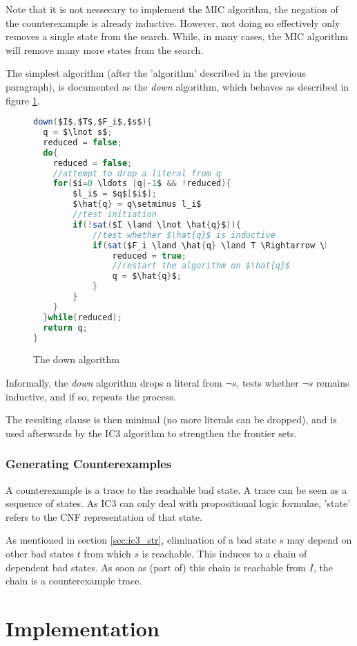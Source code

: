 \documentclass[a4paper]{article}
\begin{document}
Note that it is not nessecary to implement the MIC algorithm, the negation of the counterexample is already inductive. However, not doing so effectively only removes a single state from the search. While, in many cases, the MIC algorithm will remove many more states from the search.

The simplest algorithm (after the 'algorithm' described in the previous paragraph), is documented as the \emph{down} algorithm, which behaves as described in figure \ref{fig:down}.

\begin{figure}
\centering
\begin{lstlisting}[mathescape,language=Java]
down($I$,$T$,$F_i$,$s$){
  q = $\lnot s$;
  reduced = false;
  do{
  	reduced = false;
  	//attempt to drop a literal from q
  	for($i=0 \ldots |q|-1$ && !reduced){
  		$l_i$ = $q$[$i$];
	  	$\hat{q} = q\setminus l_i$ 
	  	//test initiation
	  	if(!sat($I \land \lnot \hat{q}$)){
	  		//test whether $\hat{q}$ is inductive
	  		if(sat($F_i \land \hat{q} \land T \Rightarrow \hat{q}'$)){
	  			reduced = true;
	  			//restart the algorithm on $\hat{q}$
	  			q = $\hat{q}$;
			}	  		
	  	}
  	}
  }while(reduced);
  return q;
}
\end{lstlisting}
\caption{The down algorithm}
\label{fig:down}
\end{figure}

Informally, the \emph{down} algorithm drops a literal from $\lnot s$, tests whether $\lnot s$ remains inductive, and if so, repeats the process.

The resulting clause is then minimal (no more literals can be dropped), and is used afterwards by the IC3 algorithm to strengthen the frontier sets.

\subsubsection{Generating Counterexamples}
A counterexample is a trace to the reachable bad state. A trace can be seen as a sequence of states. As IC3 can only deal with propositional logic formulae, 'state' refers to the CNF representation of that state.

As mentioned in section \ref{sec:ic3_str}, elimination of a bad state $s$ may depend on other bad states $t$ from which $s$ is reachable. This induces to a chain of dependent bad states. As soon as (part of) this chain is reachable from $I$, the chain is a counterexample trace.

\section{Implementation}
\end{document}
